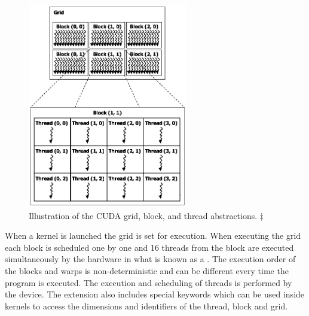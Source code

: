 \begin{figure}
  \centering
  \includegraphics[width=7cm]{./images/parallel_execution_cuda_grid.png}
\caption{Illustration of the CUDA grid, block, and thread
  abstractions. $\ddagger$}
\label{fig:cuda-grid}
\end{figure}

When a kernel is launched the grid is set for execution. When
executing the grid each block is scheduled one by one and 16 threads
from the block are executed simultaneously by the hardware in what is
known as a . The execution order of the blocks and
warps is non-deterministic and can be different every time the program
is executed. The execution and scheduling of threads is performed by
the device. 
%
The extension also includes special keywords which can be used inside
kernels to access the dimensions and identifiers of the thread, block
and grid.


